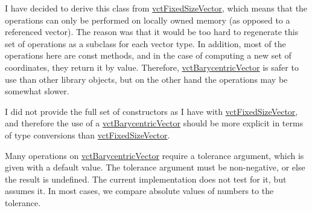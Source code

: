 I have decided to derive this class from \hyperlink{classvct_fixed_size_vector}{vct\-Fixed\-Size\-Vector}, which means that the operations can only be performed on locally owned memory (as opposed to a referenced vector). The reason was that it would be too hard to regenerate this set of operations as a subclass for each vector type. In addition, most of the operations here are const methods, and in the case of computing a new set of coordinates, they return it by value. Therefore, \hyperlink{classvct_barycentric_vector}{vct\-Barycentric\-Vector} is safer to use than other library objects, but on the other hand the operations may be somewhat slower.

I did not provide the full set of constructors as I have with \hyperlink{classvct_fixed_size_vector}{vct\-Fixed\-Size\-Vector}, and therefore the use of a \hyperlink{classvct_barycentric_vector}{vct\-Barycentric\-Vector} should be more explicit in terms of type conversions than \hyperlink{classvct_fixed_size_vector}{vct\-Fixed\-Size\-Vector}.

Many operations on \hyperlink{classvct_barycentric_vector}{vct\-Barycentric\-Vector} require a tolerance argument, which is given with a default value. The tolerance argument must be non-\/negative, or else the result is undefined. The current implementation does not test for it, but assumes it. In most cases, we compare absolute values of numbers to the tolerance. 

